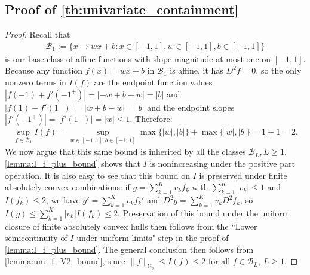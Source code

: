 \documentclass{article}
\def\cB{{\mathcal{B}}}
\def\cV{{\mathcal{V}}}
\begin{document}
\begin{appendices}
\subsection{Proof of \cref{th:univariate_containment}} \label{appendix:proof_univariate_containment}
\begin{proof}
    Recall that
    \begin{align}
        \cB_1 := \{ x \mapsto wx + b: x \in [-1,1], w \in [-1,1], b \in [-1,1] \}
    \end{align}
    is our base class of affine functions with slope magnitude at most one on $[-1,1]$. Because any function $f(x) = wx + b$ in $\cB_1$ is affine, it has $D^2 f = 0$, so the only nonzero terms in $I(f)$ are the endpoint function values $|f(-1)+f'(-1^{+})| = |-w+b+w|=|b|$ and $|f(1)-f'(1^{-})| = |w+b-w| = |b|$ and the endpoint slopes $|f'(-1^{+})| = |f'(1^{-})| = |w| \leq 1$. Therefore:
    \begin{align}
        \sup_{f \in \cB_1}  I(f) = \sup_{w \in [-1,1], b \in [-1,1]} \max\{|w|,|b| \} + \max\{|w|, |b|\} = 1+1=2.
    \end{align}
    We now argue that this same bound is inherited by all the classes $\cB_L, L \geq 1$. \cref{lemma:I_f_plus_bound} shows that $I$ is nonincreasing under the positive part operation. It is also easy to see that this bound on $I$ is preserved under finite absolutely convex combinations: if $g = \sum_{k=1}^K v_k f_k$ with $\sum_{k=1}^K |v_k| \leq 1$ and $I(f_k) \leq 2$, we have $g' = \sum_{k=1}^K v_k f_k'$ and $D^2 g = \sum_{k=1}^K v_k D^2 f_k$, so $I(g) \leq \sum_{k=1}^K |v_k| I(f_k) \leq 2$. Preservation of this bound under the uniform closure of finite absolutely convex hulls then follows from the ``Lower semicontinuity of $I$ under uniform limits" step in the proof of \cref{lemma:I_f_plus_bound}. The general conclusion then follows from \cref{lemma:uni_f_V2_bound}, since $\| f \|_{\cV_2} \leq I(f) \leq 2$ for all $f \in \cB_L$, $L \geq 1$.
\end{proof}
\end{appendices}
\end{document}
